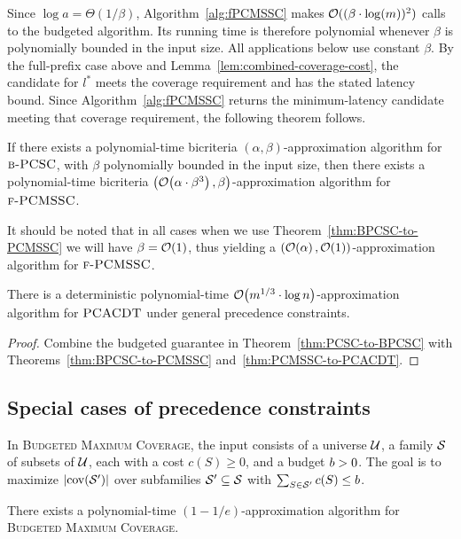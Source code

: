 Since $\log a=\Theta(1/\beta)$, Algorithm~\ref{alg:fPCMSSC} makes $\mathcal{O}((\beta\cdot\log(m))^2)$ calls to the budgeted algorithm. Its running time is therefore polynomial whenever $\beta$ is polynomially bounded in the input size. All applications below use constant $\beta$.
By the full-prefix case above and Lemma~\ref{lem:combined-coverage-cost}, the candidate for $l^*$ meets the coverage requirement and has the stated latency bound. Since Algorithm~\ref{alg:fPCMSSC} returns the minimum-latency candidate meeting that coverage requirement, the following theorem follows.
\begin{theorem}\label{thm:BPCSC-to-PCMSSC}
    \setlength{\emergencystretch}{2em}
    If there exists a polynomial-time bicriteria $(\alpha,\beta)$-approximation algorithm for $\textup{\textsc{b-PCSC}}$, with $\beta$ polynomially bounded in the input size, then there exists a polynomial-time bicriteria $\mathopen{}\left( \mathcal{O}\mathopen{}\left( \alpha\cdot\beta^3 \right), \beta \right)$-approximation algorithm for $\textup{\textsc{f-PCMSSC}}$.
\end{theorem}
It should be noted that in all cases when we use Theorem~\ref{thm:BPCSC-to-PCMSSC} we will have $\beta=\mathcal{O}\mathopen{}\left( 1 \right)$, thus yielding a $\mathopen{}\left( \mathcal{O}\mathopen{}\left( \alpha \right), \mathcal{O}\mathopen{}\left( 1 \right) \right)$-approximation algorithm for $\textup{\textsc{f-PCMSSC}}$.

\begin{corollary}\label{cor:PCACDT-general}
There is a deterministic polynomial-time $\mathcal{O}\mathopen{}\left( m^{1/3}\cdot\log n \right)$-approximation algorithm for $\textup{\textsc{PCACDT}}$ under general precedence constraints.
\end{corollary}
\begin{proof}
Combine the budgeted guarantee in Theorem~\ref{thm:PCSC-to-BPCSC} with Theorems~\ref{thm:BPCSC-to-PCMSSC} and~\ref{thm:PCMSSC-to-PCACDT}.
\end{proof}

\subsection{Special cases of precedence constraints} \label{subsection:SpecialCases}
In \textup{\textsc{Budgeted Maximum Coverage}}, the input consists of a universe $\mathcal{U}$, a family $\mathcal{S}$ of subsets of $\mathcal{U}$, each with a cost $c(S)\geq0$, and a budget $b>0$. The goal is to maximize $\mathopen{}\left| \operatorname{cov}\mathopen{}\left( \mathcal{S}' \right) \right|$ over subfamilies $\mathcal{S}'\subseteq\mathcal{S}$ with $\sum_{S\in\mathcal{S}'}c(S)\leq b$.

\begin{theorem}\label{thm:budgeted-maximum-coverage-source}
    There exists a polynomial-time $(1-1/e)$-approximation algorithm for \textup{\textsc{Budgeted Maximum Coverage}}.
\end{theorem}

